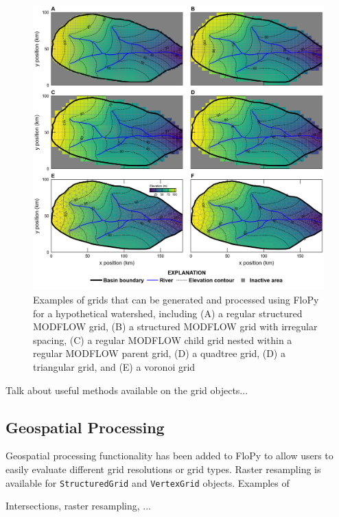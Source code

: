 \documentclass[11pt, oneside]{article}   	%
\begin{document}
\begin{figure}[ht!]
	\begin{center}
		\includegraphics{figures/grids_geoprocessing.png}
	\end{center}
	\caption{Examples of grids that can be generated and processed using FloPy for a hypothetical watershed, including (A) a regular structured MODFLOW grid, (B) a structured MODFLOW grid with irregular spacing, (C) a regular MODFLOW child grid nested within a regular MODFLOW parent grid, (D) a quadtree grid, (D) a triangular grid, and (E) a voronoi grid}\label{fig:grids}
\end{figure}

Talk about useful methods available on the grid objects...

\subsection{Geospatial Processing}

Geospatial processing functionality has been added to FloPy to allow users to easily evaluate different grid resolutions or grid types. Raster resampling is available for \texttt{StructuredGrid} and \texttt{VertexGrid} objects. Examples of   

Intersections, raster resampling, ...

\lipsum[102-108]
\end{document}
